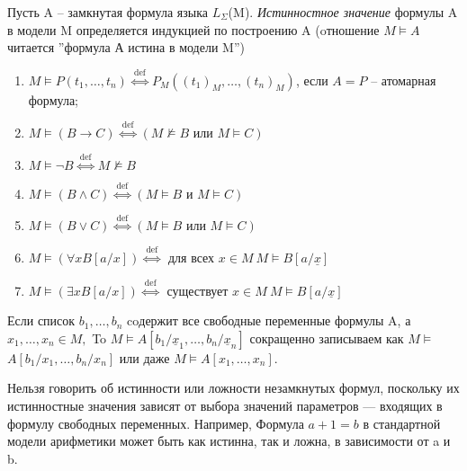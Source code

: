 \begin{definition}
	Пусть A -- замкнутая формула языка $L_{\Sigma }$(M). \textit{Истинностное значение} формулы A в модели M
	определяется индукцией по построению A (oтношение $ M \vDash A $ читается ''формула А истина в модели M'')
	\label{formula6}
	\begin{enumerate}
		\item $M \vDash P\left(t_{1}, \ldots, t_{n}\right) \stackrel{\text { def }}{\Longleftrightarrow}
			P_{M}\left(\left(t_{1}\right)_{M}, \ldots,\left(t_{n}\right)_{M}\right)$, если $A=P$ -- атомарная формула;
		\item  $M \vDash(B \rightarrow C) \stackrel{\text { def }}{\Longleftrightarrow}(M \nvDash B \text { или } M
			\vDash C)$
		\item $M \vDash \neg B \stackrel{\text { def }}{\Longleftrightarrow} M \nvDash B$
		\item $M \vDash(B \wedge C) \stackrel{\text { def }}{\Longleftrightarrow}\left(M \vDash B \text{ и } M
			\vDash C\right)$
		\item $M \vDash(B \vee C) \stackrel{\text { def }}{\Longleftrightarrow}(M \vDash B \text { или } M \vDash
			C)$
		\item $M \vDash(\forall x B[a / x]) \stackrel{\text { def }}{\Longleftrightarrow}$ для всех $x \in M \ M
			\vDash B[a /\underline{x}]$
		\item $M \vDash(\exists x B[a / x]) \stackrel{\text { def }}{\Longleftrightarrow}$ существует $x \in M \ M
			\vDash B[a/ \underline{x}]$
	\end{enumerate}
	Если список $b_{1}, \ldots , b_{n}  $ coдержит все свободные переменные формулы A, а
	$x_{1}, \ldots, x_{n} \in M,$ To $M \vDash A\left[b_{1} / \underline{x}_{1}, \ldots, b_{n} /
	\underline{x}_{n}\right]$ сокращенно записываем как $M \vDash$
	$A\left[b_{1} / x_{1}, \ldots, b_{n} / x_{n}\right]$ или даже $M \vDash A\left[x_{1}, \ldots, x_{n}\right]$.

\end{definition}
\begin{remark}
	Нельзя говорить об истинности или ложности незамкнутых формул, поскольку их истинностные значения зависят от выбора
	значений параметров — входящих в формулу свободных переменных. Например, Формула $a+1 = b$  в стандартной
	модели арифметики может быть как истинна, так и ложна, в зависимости от a и b.
\end{remark}
